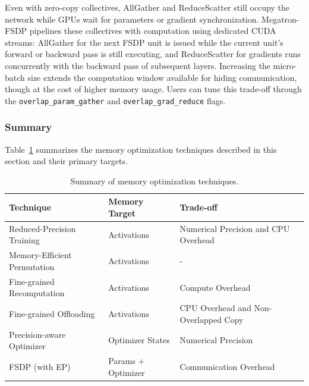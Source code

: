 \documentclass[10pt,logo,copyright]{nvidiatechreport}
\begin{document}
Even with zero-copy collectives, AllGather and ReduceScatter still occupy the network while GPUs wait for parameters or gradient synchronization. Megatron-FSDP pipelines these collectives with computation using dedicated CUDA streams: AllGather for the next FSDP unit is issued while the current unit's forward or backward pass is still executing, and ReduceScatter for gradients runs concurrently with the backward pass of subsequent layers. Increasing the micro-batch size extends the computation window available for hiding communication, though at the cost of higher memory usage. Users can tune this trade-off through the \texttt{overlap\_param\_gather} and \texttt{overlap\_grad\_reduce} flags.



\subsubsection{Summary}
Table~\ref{tab:memory-opt-summary} summarizes the memory optimization techniques described in this section and their primary targets.

\begin{table}[ht]
\centering
\caption{Summary of memory optimization techniques.}
\label{tab:memory-opt-summary}
\begin{tabular}{lll}
\toprule
\textbf{Technique} & \textbf{Memory Target} & \textbf{Trade-off} \\
\midrule
Reduced-Precision Training & Activations & Numerical Precision and CPU Overhead \\
Memory-Efficient Permutation & Activations & - \\
Fine-grained Recomputation & Activations & Compute Overhead \\
Fine-grained Offloading & Activations & CPU Overhead and Non-Overlapped Copy \\
Precision-aware Optimizer & Optimizer States & Numerical Precision \\
FSDP (with EP) & Params + Optimizer & Communication Overhead \\
\bottomrule
\end{tabular}
\end{table}
\end{document}
